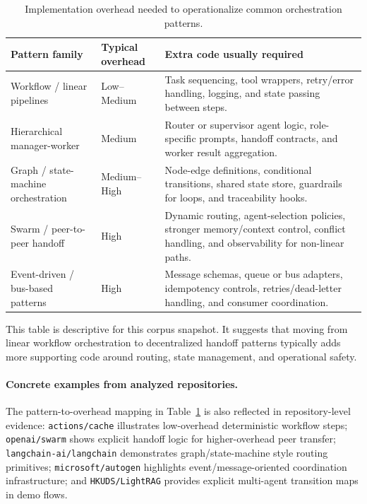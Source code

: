 \documentclass[12pt,a4paper,onecolumn]{article}
\begin{document}
\begin{table}[ht]
\centering
\begin{tabular}{p{3.0cm}p{1.8cm}p{7.0cm}}
\toprule
Pattern family & Typical overhead & Extra code usually required \\
\midrule
Workflow / linear pipelines & Low--Medium & Task sequencing, tool wrappers, retry/error handling, logging, and state passing between steps. \\
Hierarchical manager-worker & Medium & Router or supervisor agent logic, role-specific prompts, handoff contracts, and worker result aggregation. \\
Graph / state-machine orchestration & Medium--High & Node-edge definitions, conditional transitions, shared state store, guardrails for loops, and traceability hooks. \\
Swarm / peer-to-peer handoff & High & Dynamic routing, agent-selection policies, stronger memory/context control, conflict handling, and observability for non-linear paths. \\
Event-driven / bus-based patterns & High & Message schemas, queue or bus adapters, idempotency controls, retries/dead-letter handling, and consumer coordination. \\
\bottomrule
\end{tabular}
\caption{Implementation overhead needed to operationalize common orchestration patterns.}
\label{tab:overhead}
\end{table}

This table is descriptive for this corpus snapshot. It suggests that moving from linear workflow orchestration to decentralized handoff patterns typically adds more supporting code around routing, state management, and operational safety.

\paragraph{Concrete examples from analyzed repositories.}
The pattern-to-overhead mapping in Table~\ref{tab:overhead} is also reflected in repository-level evidence: \texttt{actions/cache} illustrates low-overhead deterministic workflow steps; \texttt{openai/swarm} shows explicit handoff logic for higher-overhead peer transfer; \texttt{langchain-ai/langchain} demonstrates graph/state-machine style routing primitives; \texttt{microsoft/autogen} highlights event/message-oriented coordination infrastructure; and \texttt{HKUDS/LightRAG} provides explicit multi-agent transition maps in demo flows.
\end{document}
